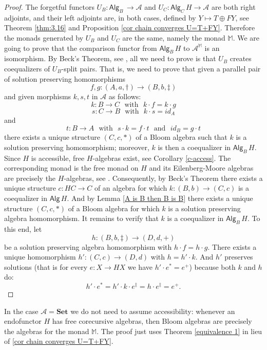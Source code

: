 \documentclass{LMCS}
\theoremstyle{plain}
\theoremstyle{definition}
\numberwithin{equation}{section}
\begin{document}
\begin{proof}
The forgetful functors $U_B:\mathsf{Alg}_B\,\rightarrow \mathcal A$ and $U_C:\mathsf{Alg}_C\,H\rightarrow \mathcal A$ are both right adjoints, and their left adjoints are, in  both cases, defined by $Y\mapsto T\oplus FY$, see Theorem \ref{thm:3.16} and Proposition \ref{cor chain converges U=T+FY}. Therefore the monads generated by $U_B$ and $U_C$ are the same, namely the monad $\mathbb M$. We are going to prove that the comparison functor from $\mathsf{Alg}_B\,H$ to ${\mathcal A}^{\mathbb M}$ is an isomorphism. By Beck's Theorem, see \cite[4.4.4]{bor}, all we need to prove is that $U_B$ creates coequalizers of $U_B$-split pairs. That is, we need to prove that given a parallel pair of solution preserving homomorphisms
$$f,g:(A,a,\dagger)\rightarrow (B,b,\ddagger)$$
and given morphisms $k,s,t$ in $\mathcal A$ as follows:
$$k:B\rightarrow C\ \ \ \text{with}\ \ \ k\cdot f=k\cdot g$$
$$s:C\rightarrow B\ \ \ \text{with}\ \ \ k\cdot s=id_A$$ and
$$t:B\rightarrow A\ \ \ \text{with}\ \ \ s\cdot k=f\cdot t\ \ \ \text{and}\ \ \ id_B=g\cdot t$$
there exists a unique structure $(C,c,*)$ of a Bloom algebra such that $k$ is a solution preserving homomorphism; moreover, $k$ is then a coequalizer in $\mathsf{Alg}_B\,H$. Since $H$ is accessible, free $H$-algebras exist, see Corollary \ref{c-access}. The corresponding monad  is the free monad on $H$ and its Eilenberg-Moore algebras are precisely the $H$-algebras, see \cite{b}. Consequently, by Beck's Theorem there exists a unique structure $c:HC\rightarrow C$ of an algebra for which $k:(B,b)\rightarrow (C,c)$ is a coequalizer in $\mathsf{Alg}\,H$.
 And by Lemma \ref{A is B then B is B}  there exists a unique
 structure $(C,c,*)$ of a Bloom algebra for which $k$ is a solution
 preserving algebra homomorphism. It remains to verify that $k$ is a coequalizer in $\mathsf{Alg}_B\,H$. To this end, let
$$h:(B,b,\ddagger)\rightarrow (D,d,+)$$ be a solution preserving
algebra homomorphism with $h\cdot f=h\cdot g$. There exists a unique homomorphism $h':(C,c)\rightarrow (D,d)$ with $h=h'\cdot k$. And $h'$ preserves solutions (that is for every $e:X\rightarrow HX$ we have $h'\cdot e^*=e^+$) because both $k$ and $h$ do:
$$h'\cdot e^*=h'\cdot k\cdot e^\ddagger=h\cdot e^\ddagger=e^+.$$

\vspace*{-17pt}
\end{proof}

\begin{rem}
In the case $\mathcal A=\mathbf{Set}$ we do not need to assume accessibility: whenever an endofunctor $H$ has free corecursive algebras, then Bloom algebras are precisely the algebras for the monad $\mathbb M$. The proof just uses Theorem \ref{equivalence 1} in lieu of \ref{cor chain converges U=T+FY}.
\end{rem}
\end{document}
